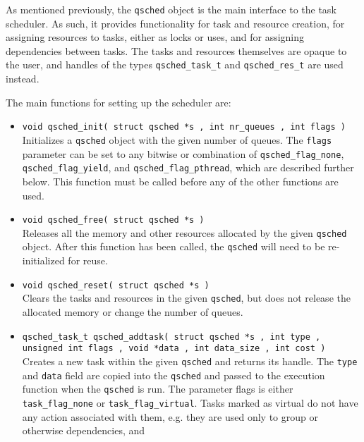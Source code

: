 \documentclass[preprint]{elsarticle}
\begin{document}
As mentioned previously, the {\tt qsched} object is the main
interface to the task scheduler.
As such, it provides functionality for task and resource
creation, for assigning resources to tasks, either as locks
or uses, and for assigning dependencies between tasks.
The tasks and resources themselves are opaque to the
user, and handles of the types {\tt qsched\_task\_t}
and {\tt qsched\_res\_t} are used instead.

The main functions for setting up the scheduler are:
\begin{itemize}
    \item {\tt void qsched\_init( struct qsched *s , int nr\_queues , int flags )} \\
        Initializes a {\tt qsched} object with the given number of queues.
        The {\tt flags} parameter can be set to any bitwise or combination
        of {\tt qsched\_flag\_none},
        {\tt qsched\_flag\_yield}, and {\tt qsched\_flag\_pthread},
        which are described further below.
        This function must be called before any of the other
        functions are used.
        \vspace{1mm}
    \item {\tt void qsched\_free( struct qsched *s )} \\
        Releases all the memory and other resources allocated by the
        given {\tt qsched} object.
        After this function has been called, the {\tt qsched} will
        need to be re-initialized for reuse.
        \vspace{1mm}
    \item {\tt void qsched\_reset( struct qsched *s )} \\
        Clears the tasks and resources in the given {\tt qsched},
        but does not release the allocated memory or change
        the number of queues.
        \vspace{1mm}
    \item {\tt qsched\_task\_t qsched\_addtask( struct qsched *s , int type , unsigned int flags , void *data , int data\_size , int cost )} \\
        Creates a new task within the given {\tt qsched} and returns
        its handle.
        The {\tt type} and {\tt data} field are copied into the {\tt qsched}
        and passed to the execution function when the {\tt qsched} is run.
        The parameter flags is either {\tt task\_flag\_none} or
        {\tt task\_flag\_virtual}.
        Tasks marked as virtual do not have any action associated with them,
        e.g. they are used only to group or otherwise dependencies, and

\end{itemize}
\end{document}
